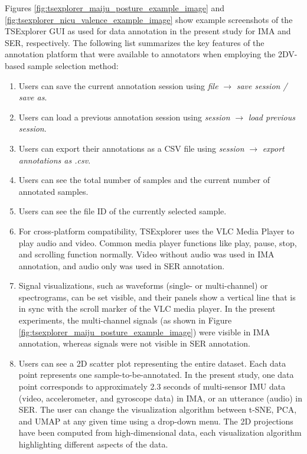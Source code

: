 \documentclass[a4paper,fleqn]{cas-dc}
\begin{document}
Figures \ref{fig:tsexplorer_maiju_posture_example_image} and \ref{fig:tsexplorer_nicu_valence_example_image} show example screenshots of the TSExplorer GUI as used for data annotation in the present study for IMA and SER, respectively. The following list summarizes the key features of the annotation platform that were available to annotators when employing the 2DV-based sample selection method:
\begin{enumerate}
    \item Users can save the current annotation session using \textit{file} $\rightarrow$ \textit{save session / save as}.
    \item Users can load a previous annotation session using \textit{session} $\rightarrow$ \textit{load previous session}.
    \item Users can export their annotations as a CSV file using \textit{session} $\rightarrow$ \textit{export annotations as .csv}.
    \item Users can see the total number of samples and the current number of annotated samples.
    \item Users can see the file ID of the currently selected sample.
    \item For cross-platform compatibility, TSExplorer uses the VLC Media Player to play audio and video. Common media player functions like play, pause, stop, and scrolling function normally. Video without audio was used in IMA annotation, and audio only was used in SER annotation.
    \item Signal visualizations, such as waveforms (single- or multi-channel) or spectrograms, can be set visible, and their panels show a vertical line that is in sync with the scroll marker of the VLC media player. In the present experiments, the multi-channel signals (as shown in Figure \ref{fig:tsexplorer_maiju_posture_example_image}) were visible in IMA annotation, whereas signals were not visible in SER annotation.
    \item Users can see a 2D scatter plot representing the entire dataset. Each data point represents one sample-to-be-annotated. In the present study, one data point corresponds to approximately 2.3 seconds of multi-sensor IMU data (video, accelerometer, and gyroscope data) in IMA, or an utterance (audio) in SER. The user can change the visualization algorithm between t-SNE, PCA, and UMAP at any given time using a drop-down menu. The 2D projections have been computed from high-dimensional data, each visualization algorithm highlighting different aspects of the data.

\end{enumerate}
\end{document}
